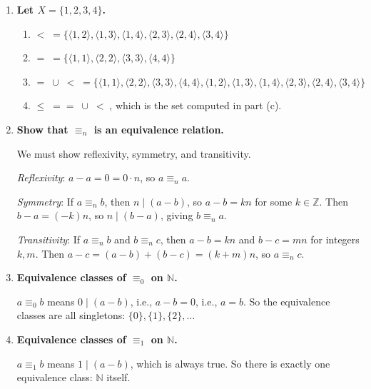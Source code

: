 \documentclass[11pt]{book}
\def\NN{\mathbb{N}}
\def\ZN{\mathbb{Z}}
\begin{document}
\begin{enumerate}[{0.}1. ]
\item \textbf{Let $X=\{1,2,3,4\}$.}

\begin{enumerate}
\item $< \;=\{\langle 1,2\rangle,\langle 1,3\rangle,\langle 1,4\rangle,\langle 2,3\rangle,\langle 2,4\rangle,\langle 3,4\rangle\}$

\item $= \;= \{\langle 1,1\rangle,\langle 2,2\rangle,\langle 3,3\rangle,\langle 4,4\rangle\}$

\item $=\;\cup\;<\;= \{\langle 1,1\rangle,\langle 2,2\rangle,\langle 3,3\rangle,\langle 4,4\rangle,\langle 1,2\rangle,\langle 1,3\rangle,\langle 1,4\rangle,\langle 2,3\rangle,\langle 2,4\rangle,\langle 3,4\rangle\}$

\item $\leq \;= =\;\cup\;<\;$, which is the set computed in part (c).
\end{enumerate}

\item \textbf{Show that $\equiv_n$ is an equivalence relation.}

We must show reflexivity, symmetry, and transitivity.

\textit{Reflexivity}: $a - a = 0 = 0 \cdot n$, so $a \equiv_n a$.

\textit{Symmetry}: If $a \equiv_n b$, then $n \mid (a-b)$, so $a - b = kn$ for some $k \in \ZN$. Then $b - a = (-k)n$, so $n \mid (b-a)$, giving $b \equiv_n a$.

\textit{Transitivity}: If $a \equiv_n b$ and $b \equiv_n c$, then $a - b = kn$ and $b - c = mn$ for integers $k,m$. Then $a - c = (a-b)+(b-c) = (k+m)n$, so $a \equiv_n c$.

\item \textbf{Equivalence classes of $\equiv_0$ on $\NN$.}

$a \equiv_0 b$ means $0 \mid (a-b)$, i.e., $a - b = 0$, i.e., $a = b$. So the equivalence classes are all singletons: $\{0\}, \{1\}, \{2\}, \ldots$

\item \textbf{Equivalence classes of $\equiv_1$ on $\NN$.}

$a \equiv_1 b$ means $1 \mid (a - b)$, which is always true. So there is exactly one equivalence class: $\NN$ itself.


\end{enumerate}
\end{document}
